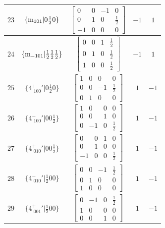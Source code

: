 \documentclass[fleqn,8pt]{jsarticle}
\begin{document}
\begin{longtable}{ccccc}
$ 23 $ & $ \{{\rm m}_{101}|0 \frac{1}{2} 0\} $ & $ \begin{bmatrix} 0 & 0 & -1 & 0 \\ 0 & 1 & 0 & \frac{1}{2} \\ -1 & 0 & 0 & 0 \end{bmatrix} $ & $ -1 $ & $ 1 $ \\ \hline
$ 24 $ & $ \{{\rm m}_{-101}|\frac{1}{2} \frac{1}{2} \frac{1}{2}\} $ & $ \begin{bmatrix} 0 & 0 & 1 & \frac{1}{2} \\ 0 & 1 & 0 & \frac{1}{2} \\ 1 & 0 & 0 & \frac{1}{2} \end{bmatrix} $ & $ -1 $ & $ 1 $ \\ \hline
$ 25 $ & $ \{4^{+}_{\,\,100}{}'|0 \frac{1}{2} 0\} $ & $ \begin{bmatrix} 1 & 0 & 0 & 0 \\ 0 & 0 & -1 & \frac{1}{2} \\ 0 & 1 & 0 & 0 \end{bmatrix} $ & $ 1 $ & $ -1 $ \\ \hline
$ 26 $ & $ \{4^{-}_{\,\,100}{}'|0 0 \frac{1}{2}\} $ & $ \begin{bmatrix} 1 & 0 & 0 & 0 \\ 0 & 0 & 1 & 0 \\ 0 & -1 & 0 & \frac{1}{2} \end{bmatrix} $ & $ 1 $ & $ -1 $ \\ \hline
$ 27 $ & $ \{4^{+}_{\,\,010}{}'|0 0 \frac{1}{2}\} $ & $ \begin{bmatrix} 0 & 0 & 1 & 0 \\ 0 & 1 & 0 & 0 \\ -1 & 0 & 0 & \frac{1}{2} \end{bmatrix} $ & $ 1 $ & $ -1 $ \\ \hline
$ 28 $ & $ \{4^{-}_{\,\,010}{}'|\frac{1}{2} 0 0\} $ & $ \begin{bmatrix} 0 & 0 & -1 & \frac{1}{2} \\ 0 & 1 & 0 & 0 \\ 1 & 0 & 0 & 0 \end{bmatrix} $ & $ 1 $ & $ -1 $ \\ \hline
$ 29 $ & $ \{4^{+}_{\,\,001}{}'|\frac{1}{2} 0 0\} $ & $ \begin{bmatrix} 0 & -1 & 0 & \frac{1}{2} \\ 1 & 0 & 0 & 0 \\ 0 & 0 & 1 & 0 \end{bmatrix} $ & $ 1 $ & $ -1 $ \\ \hline

\end{longtable}
\end{document}
